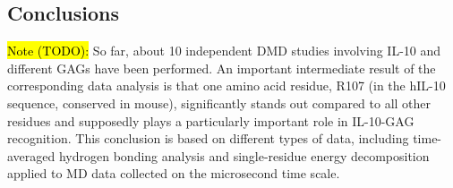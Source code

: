 \subsection{Conclusions}

\hl{Note (TODO):}
So far, about 10 independent DMD studies involving IL-10 and different GAGs
have been performed. An important intermediate result of the corresponding data
analysis is that one amino acid residue, R107 (in the hIL-10 sequence, conserved
in mouse), significantly stands out compared to all other residues and
supposedly plays a particularly important role in IL-10-GAG recognition. This
conclusion is based on different types of data, including time-averaged hydrogen
bonding analysis and single-residue energy decomposition applied to MD data
collected on the microsecond time scale.

